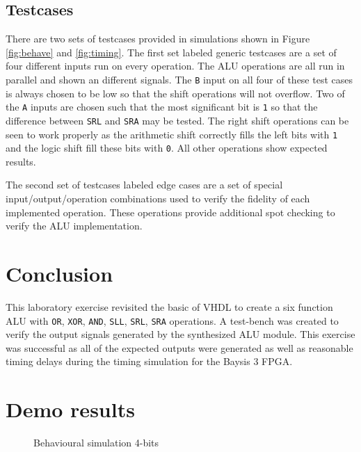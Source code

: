 \documentclass[CMPE]{../KGCOEReport}
\def\code#1{\texttt{#1}}
\begin{document}
    \subsection*{Testcases}
    There are two sets of testcases provided in simulations shown in Figure \ref{fig:behave} and \ref{fig:timing}.
    The first set labeled generic testcases are a set of four different inputs run on every operation.
    The ALU operations are all run in parallel and shown an different signals.
    The \code{B} input on all four of these test cases is always chosen to be low so that the shift operations
    will not overflow.
    Two of the \code{A} inputs are chosen such that the most significant bit is \code{1} so that the difference between
    \code{SRL} and \code{SRA} may be tested.
    The right shift operations can be seen to work properly as the arithmetic shift correctly fills the left bits with
    \code{1} and the logic shift fill these bits with \code{0}.
    All other operations show expected results.

    The second set of testcases labeled edge cases are a set of special input/output/operation combinations used to
    verify the fidelity of each implemented operation.
    These operations provide additional spot checking to verify the ALU implementation.

    \section*{Conclusion}
    This laboratory exercise revisited the basic of VHDL to create a six function ALU with \code{OR}, \code{XOR},
    \code{AND}, \code{SLL}, \code{SRL}, \code{SRA} operations.
    A test-bench was created to verify the output signals generated by the synthesized ALU module.
    This exercise was successful as all of the expected outputs were generated as well as reasonable timing delays
    during the timing simulation for the Baysis 3 FPGA.

    \pagebreak
    \section*{Demo results}
    \begin{figure}[h!]
        \centering
        \caption{Behavioural simulation 4-bits}
        \label{fig:demo1}
    \end{figure}
\end{document}
